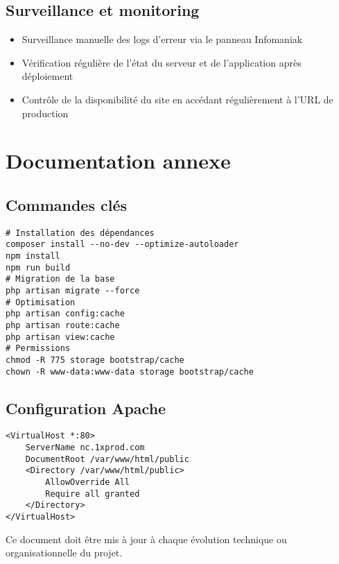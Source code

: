 \documentclass[a4paper,12pt]{report}
\begin{document}
\subsection{Surveillance et monitoring}
\begin{itemize}
  \item Surveillance manuelle des logs d’erreur via le panneau Infomaniak
  \item Vérification régulière de l’état du serveur et de l’application après déploiement
  \item Contrôle de la disponibilité du site en accédant régulièrement à l’URL de production
\end{itemize}

\section{Documentation annexe}
\subsection{Commandes clés}
\begin{verbatim}
# Installation des dépendances
composer install --no-dev --optimize-autoloader
npm install
npm run build
# Migration de la base
php artisan migrate --force
# Optimisation
php artisan config:cache
php artisan route:cache
php artisan view:cache
# Permissions
chmod -R 775 storage bootstrap/cache
chown -R www-data:www-data storage bootstrap/cache
\end{verbatim}

\subsection{Configuration Apache}
\begin{verbatim}
<VirtualHost *:80>
    ServerName nc.1xprod.com
    DocumentRoot /var/www/html/public
    <Directory /var/www/html/public>
        AllowOverride All
        Require all granted
    </Directory>
</VirtualHost>
\end{verbatim}

\begin{notebox}
Ce document doit être mis à jour à chaque évolution technique ou organisationnelle du projet.
\end{notebox}
\end{document}
